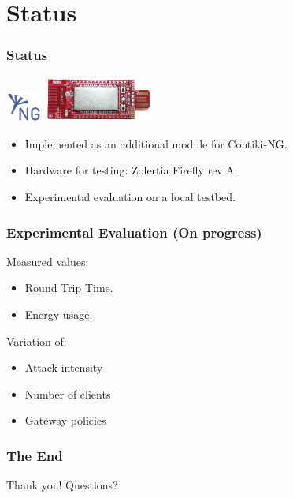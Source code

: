 \documentclass{beamer}
\begin{document}
\section{Status}

\begin{frame}
\frametitle{Status}
\includegraphics[height=1cm]{gambar/contiki.png}      
\includegraphics[height=1.5cm]{gambar/firefly.png}
\begin{itemize}
\item<1-> Implemented as an additional module for Contiki-NG.
\item<2-> Hardware for testing: Zolertia Firefly rev.A.
\item<3-> Experimental evaluation on a local testbed.
\end{itemize}
\end{frame}

\begin{frame}
\frametitle{Experimental Evaluation (On progress)}
Measured values:
\begin{itemize}
\item Round Trip Time.
\item Energy usage.
\end{itemize}

Variation of:
\begin{itemize}
\item Attack intensity
\item Number of clients
\item Gateway policies
\end{itemize}
\end{frame}

\begin{frame}
\frametitle{The End}
Thank you! Questions?
\end{frame}

\end{document}
